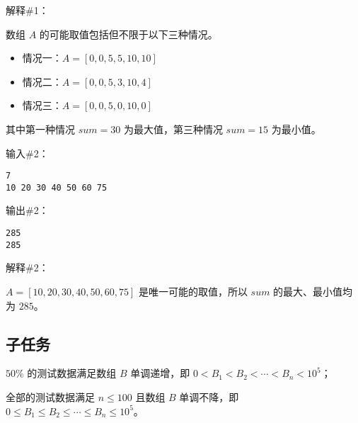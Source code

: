 解释\#1：

数组 $A$ 的可能取值包括但不限于以下三种情况。

\begin{itemize}
    \item 情况一：$A = [0, 0, 5, 5, 10, 10]$
    \item 情况二：$A = [0, 0, 5, 3, 10, 4]$
    \item 情况三：$A = [0, 0, 5, 0, 10, 0]$
\end{itemize}

其中第一种情况 $sum = 30$ 为最大值，第三种情况 $sum = 15$ 为最小值。

输入\#2：

\begin{lstlisting}
7
10 20 30 40 50 60 75
\end{lstlisting}

输出\#2：

\begin{lstlisting}
285
285
\end{lstlisting}

解释\#2：

$A = [10, 20, 30, 40, 50, 60, 75]$ 是唯一可能的取值，所以 $sum$ 的最大、最小值均为 $285$。

\subsection*{子任务}

$50\%$ 的测试数据满足数组 $B$ 单调递增，即 $0 < B_1 < B_2 < \cdots < B_n < 10^{5}$；

全部的测试数据满足 $n \le 100$ 且数组 $B$ 单调不降，即 $0 \le B_1 \le B_2 \le \cdots \le B_n \le 10^{5}$。


